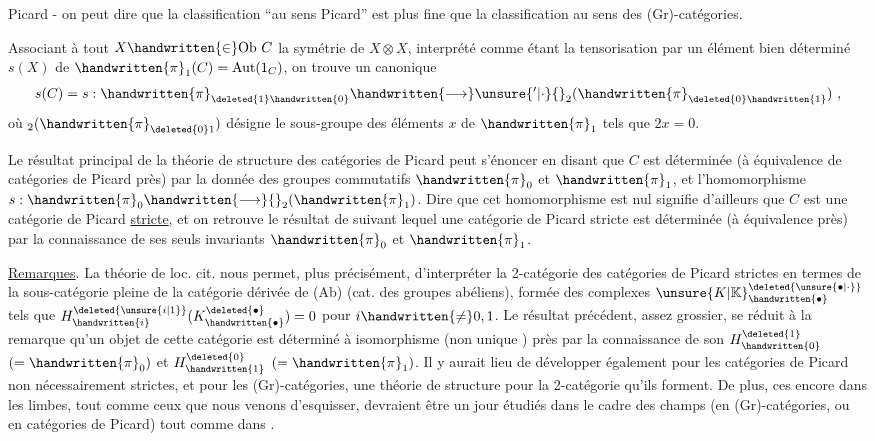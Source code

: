 
Picard - on peut dire que la classification ``au sens Picard'' est plus fine que la classification au sens des (Gr)-catégories. 

Associant à tout $X\handwritten{\in}\mathrm{Ob}\ C$ la symétrie de $X\otimes X$, interprété comme  étant la tensorisation par un élément bien déterminé $s(X)$ de $\handwritten{\pi}_{1}(C)=\mathrm{Aut}(1_C)$, on trouve un  canonique
\[
s(C)=s:\handwritten{\pi}_{\deleted{1}\handwritten{0}}\handwritten{\longrightarrow}\unsure{{}'|\cdot}{}_{2}(\handwritten{\pi}_{\deleted{0}\handwritten{1}})\ ,
\]
où $ {}_{2}(\handwritten{\pi}_{\deleted{0}1})$ désigne le sous-groupe des éléments $x$ de $\handwritten{\pi}_{1}$ tels que $2x=0$.

Le résultat principal de la théorie de structure des catégories de Picard peut s'énoncer en disant que $C$ est déterminée (à équivalence  de catégories de Picard près) par la donnée des groupes commutatifs $\handwritten{\pi}_{0}$ et $\handwritten{\pi}_{1}$, et l'homomorphisme $s:\handwritten{\pi}_{0}\handwritten{\longrightarrow}{}_{2}(\handwritten{\pi}_{1})$. Dire que cet homomorphisme est nul signifie d'ailleurs que $C$ est une catégorie de Picard \uline{stricte}, et on retrouve le résultat de \handwritten{[\, ]} suivant lequel une catégorie de Picard stricte est déterminée (à équivalence près) par la connaissance de ses seuls invariants $\handwritten{\pi}_{0}$ et $\handwritten{\pi}_{1}$.

\uline{Remarques}. La théorie de loc. cit. nous permet, plus précisément, d'interpréter la 2-catégorie des catégories de Picard strictes en termes de la sous-catégorie pleine de la catégorie dérivée de (Ab) (cat. des groupes abéliens), formée des complexes ${\unsure{K|\mathbb{K}}}^{\deleted{\unsure{\bullet|\cdot}}}_{\handwritten{\bullet}}$ tels que $H^{\deleted{\unsure{i|1}}}_{\handwritten{i}}(K^{\deleted{\bullet}}_{\handwritten{\bullet}})=0$ pour $i\handwritten{\ne}0,1$. Le résultat précédent, assez grossier, se réduit  à la remarque qu'un objet de cette catégorie est déterminé à isomorphisme (non unique \handwritten{!}) près par la connaissance de son $H^{\deleted{1}}_{\handwritten{0}}$ $(=\handwritten{\pi}_{0})$ et $H^{\deleted{0}}_{\handwritten{1}}$ $(=\handwritten{\pi}_{1})$. Il y aurait lieu de développer également pour les catégories de Picard non nécessairement strictes, et pour les (Gr)-catégories, une théorie de structure pour la 2-catégorie qu'ils forment. De plus, ces  encore dans les limbes, tout comme ceux que  nous venons d'esquisser, devraient être un jour  étudiés dans le cadre des champs (en (Gr)-catégories, ou en catégories de Picard) tout comme dans  \handwritten{[\, ]}.

